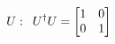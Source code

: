 \documentclass[preview]{standalone}
\begin{document}
\begin{align*}
U: \hspace{5px} U^\dagger U = \begin{bmatrix} 1 & 0 \\ 0 & 1 \end{bmatrix}
\end{align*}
\end{document}
